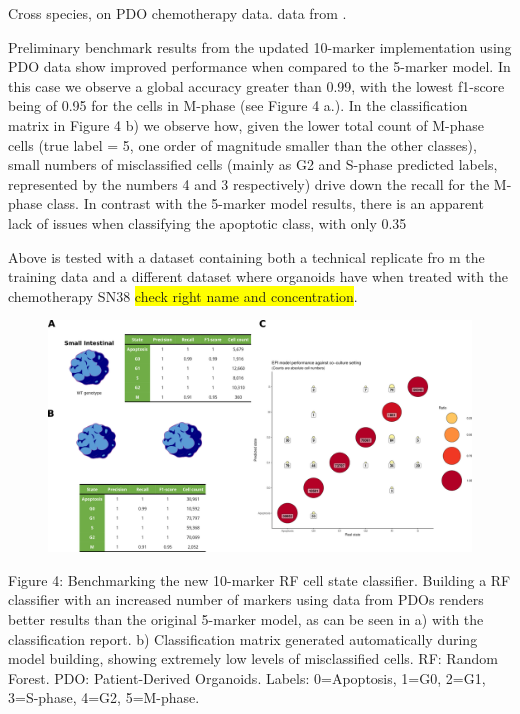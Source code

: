Cross species, on PDO chemotherapy data. data from \cite{zapatero_trellis_2023}.

Preliminary benchmark results from the updated 10-marker implementation using PDO data show improved performance when compared to the 5-marker model. In this case we observe a global accuracy greater than 0.99, with the lowest f1-score being of 0.95 for the cells in M-phase (see Figure 4 a.). In the classification matrix in Figure 4 b) we observe how, given the lower total count of M-phase cells (true label = 5, one order of magnitude smaller than the other classes), small numbers of misclassified cells (mainly as G2 and S-phase predicted labels, represented by the numbers 4 and 3 respectively) drive down the recall for the M-phase class. 
In contrast with the 5-marker model results, there is an apparent lack of issues when classifying the apoptotic class, with only 0.35%

Above is tested with a dataset containing both a technical replicate fro m the training data and a different dataset where organoids have when treated with the chemotherapy SN38 \colorbox{yellow}{check right name and concentration}. 

\begin{figure}
    \centering
    \includegraphics{03cytof/figs/3CLASS_10m.png}
    \caption{}
    \label{fig:3class10m}
\end{figure}
 
Figure 4: Benchmarking the new 10-marker RF cell state classifier. Building a RF classifier with an increased number of markers using data from PDOs renders better results than the original 5-marker model, as can be seen in a) with the classification report. b) Classification matrix generated automatically during model building, showing extremely low levels of misclassified cells. RF: Random Forest. PDO: Patient-Derived Organoids. Labels: 0=Apoptosis, 1=G0, 2=G1, 3=S-phase, 4=G2, 5=M-phase.

